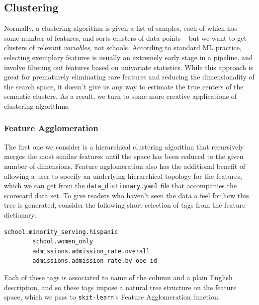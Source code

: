 \documentclass[paper.tex]{subfiles}
\begin{document}
	\subsection{Clustering}
	Normally, a clustering algorithm is given a list of samples, each of which has some number of features, and sorts clusters of data points -- but we want to get clusters of relevant \textit{variables}, not schools. According to standard ML practice, selecting exemplary features is usually an extremely early stage in a pipeline, and involve filtering out features based on univariate statistics\cite{univariate}. While this approach is great for prematurely eliminating rare features and reducing the dimensionality of the search space, it doesn't give us any way to estimate the true centers of the semantic clusters. As a result, we turn to some more creative applications of clustering algorithms.
	
	\subsubsection{Feature Agglomeration} The first one we consider is a hierarchical clustering algorithm that recursively merges the most similar features until the space has been reduced to the given number of dimensions. Feature agglomeration also has the additional benefit of allowing a user to specify an underlying hierarchical topology for the features, which we can get from the \texttt{data\_dictionary.yaml} file that accompanies the scorecard data set. To give readers who haven't seen the data a feel for how this tree is generated, consider the following short selection of tags from the feature dictionary:
	\begin{Verbatim}[xleftmargin=.5in]
		school.minority_serving.hispanic
		school.women_only
		admissions.admission_rate.overall
		admissions.admission_rate.by_ope_id
	\end{Verbatim}
	Each of these tags is associated to name of the column and a plain English description, and so these tags impose a natural tree structure on the feature space, which we pass to \texttt{skit-learn}'s Feature Agglomeration function.
	
\end{document}
